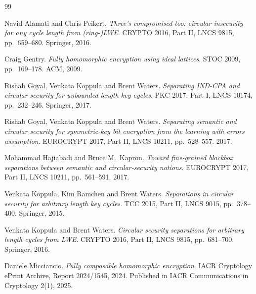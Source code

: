 \documentclass{aicr-conjecture}
\begin{document}
\begin{aicrbibliography}{99}

Navid Alamati and Chris Peikert.
\emph{Three's compromised too: circular insecurity for any cycle length
from (ring-)LWE}.
CRYPTO 2016, Part II, LNCS 9815, pp.\ 659--680. Springer, 2016.

Craig Gentry.
\emph{Fully homomorphic encryption using ideal lattices}.
STOC 2009, pp.\ 169--178. ACM, 2009.

Rishab Goyal, Venkata Koppula and Brent Waters.
\emph{Separating IND-CPA and circular security for unbounded length key
cycles}.
PKC 2017, Part I, LNCS 10174, pp.\ 232--246. Springer, 2017.

Rishab Goyal, Venkata Koppula and Brent Waters.
\emph{Separating semantic and circular security for symmetric-key bit
encryption from the learning with errors assumption}.
EUROCRYPT 2017, Part II, LNCS 10211, pp.\ 528--557. 2017.

Mohammad Hajiabadi and Bruce M.\ Kapron.
\emph{Toward fine-grained blackbox separations between semantic and
circular-security notions}.
EUROCRYPT 2017, Part II, LNCS 10211, pp.\ 561--591. 2017.

Venkata Koppula, Kim Ramchen and Brent Waters.
\emph{Separations in circular security for arbitrary length key
cycles}.
TCC 2015, Part II, LNCS 9015, pp.\ 378--400. Springer, 2015.

Venkata Koppula and Brent Waters.
\emph{Circular security separations for arbitrary length cycles from
LWE}.
CRYPTO 2016, Part II, LNCS 9815, pp.\ 681--700. Springer, 2016.

Daniele Micciancio.
\emph{Fully composable homomorphic encryption}.
IACR Cryptology ePrint Archive, Report 2024/1545, 2024. Published in
IACR Communications in Cryptology 2(1), 2025.

\end{aicrbibliography}
\end{document}
